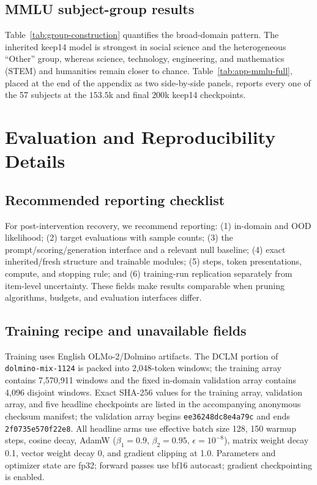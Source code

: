 \subsection{MMLU subject-group results}
\label{app:mmlu-subjects}



Table~\ref{tab:group-construction} quantifies the broad-domain pattern. The
inherited keep14 model is strongest in social science and the heterogeneous
``Other'' group, whereas science, technology, engineering, and mathematics
(STEM) and humanities remain closer to chance.
Table~\ref{tab:app-mmlu-full}, placed at the
end of the appendix as two side-by-side panels, reports every one of the 57
subjects at the $153.5$k and final $200$k keep14 checkpoints.

\section{Evaluation and Reproducibility Details}
\label{app:repro}

\subsection{Recommended reporting checklist}
\label{app:reporting-checklist}
For post-intervention recovery, we recommend reporting: (1) in-domain and OOD
likelihood; (2) target evaluations with sample counts; (3) the
prompt/scoring/generation interface and a relevant null baseline; (4) exact
inherited/fresh structure and trainable modules; (5) steps, token
presentations, compute, and stopping rule; and (6) training-run replication
separately from item-level uncertainty. These fields make results comparable
when pruning algorithms, budgets, and evaluation interfaces differ.

\subsection{Training recipe and unavailable fields}
Training uses English OLMo-2/Dolmino artifacts. The DCLM portion of
\texttt{dolmino-mix-1124} is packed into 2,048-token windows; the training array
contains 7,570,911 windows and the fixed in-domain validation array contains
4,096 disjoint windows. Exact SHA-256 values for the training array, validation array, and five
headline checkpoints are listed in the accompanying anonymous checksum
manifest; the validation array begins \texttt{ee36248dc8e4a79c} and ends
\texttt{2f0735e570f22e8}. All headline arms use effective
batch size 128, 150 warmup steps, cosine decay, AdamW
($\beta_1{=}0.9$, $\beta_2{=}0.95$, $\epsilon{=}10^{-8}$), matrix weight decay
0.1, vector weight decay 0, and gradient clipping at 1.0. Parameters and
optimizer state are fp32; forward passes use bf16 autocast; gradient
checkpointing is enabled.

